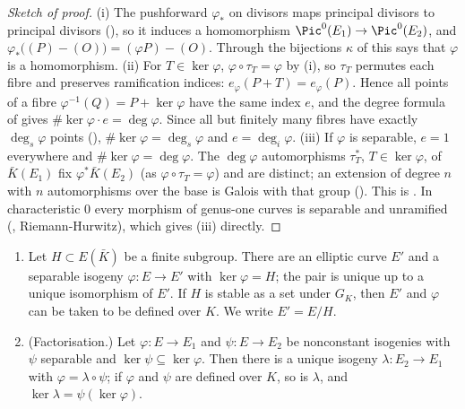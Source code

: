 \begin{proof}[Sketch of proof]
(i) The pushforward $\varphi_*$ on divisors maps principal divisors to principal divisors (), so it induces a homomorphism
$\Pic^0(E_1)\to\Pic^0(E_2)$, and $\varphi_*\bigl((P)-(O)\bigr)=(\varphi P)-(O)$. Through the bijections $\kappa$ of  this says that
$\varphi$ is a homomorphism. (ii) For $T\in\ker\varphi$, $\varphi\circ\tau_T=\varphi$ by (i), so $\tau_T$ permutes each fibre and preserves ramification indices:
$e_\varphi(P+T)=e_\varphi(P)$. Hence all points of a fibre $\varphi^{-1}(Q)=P+\ker\varphi$ have the same index $e$, and the degree formula of  gives
$\#\ker\varphi\cdot e=\deg\varphi$. Since all but finitely many fibres have exactly $\deg_s\varphi$ points (), $\#\ker\varphi=\deg_s\varphi$ and
$e=\deg_i\varphi$. (iii) If $\varphi$ is separable, $e=1$ everywhere and $\#\ker\varphi=\deg\varphi$. The $\deg\varphi$ automorphisms $\tau_T^*$, $T\in\ker\varphi$, of
$\bar K(E_1)$ fix $\varphi^*\bar K(E_2)$ (as $\varphi\circ\tau_T=\varphi$) and are distinct; an extension of degree $n$ with $n$ automorphisms over the base is
Galois with that group (). This is \cite[Section III.4]{SilvermanAEC}. In characteristic $0$ every morphism of genus-one curves is
separable and unramified (, Riemann-Hurwitz), which gives (iii) directly.
\end{proof}

\begin{theorem}\label{thm:ellcurves:quotient}
\leavevmode
\begin{enumerate}[label=(\roman*)]
\item Let $H\subset E(\bar K)$ be a finite subgroup. There are an elliptic curve $E'$ and a separable isogeny $\varphi\colon E\to E'$ with $\ker\varphi=H$;
the pair is unique up to a unique isomorphism of $E'$. If $H$ is stable as a set under $G_K$, then $E'$ and $\varphi$ can be taken to be defined over $K$.
We write $E'=E/H$.
\item (Factorisation.) Let $\varphi\colon E\to E_1$ and $\psi\colon E\to E_2$ be nonconstant isogenies with $\psi$ separable and $\ker\psi\subseteq\ker\varphi$.
Then there is a unique isogeny $\lambda\colon E_2\to E_1$ with $\varphi=\lambda\circ\psi$; if $\varphi$ and $\psi$ are defined over $K$, so is $\lambda$, and
$\ker\lambda=\psi(\ker\varphi)$.
\end{enumerate}
\end{theorem}

